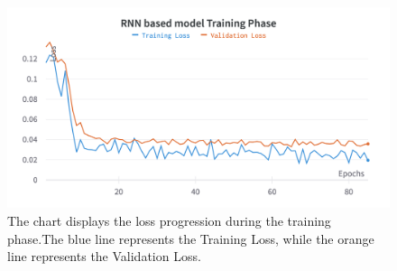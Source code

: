 \begin{figure}[H]
	\centering
	\includegraphics[width=.8\linewidth]{chapters/3_models/imgs/grrun/grruntraining.png}
	\caption{The chart displays the loss progression during the training phase.The blue line represents the Training Loss, while the orange line represents the Validation Loss.}
	\label{fig:grruntraining}
\end{figure}

